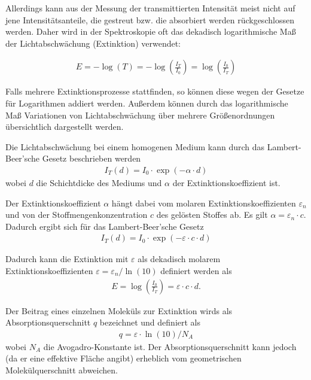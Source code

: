 \documentclass{article}
\begin{document}
Allerdings kann aus der Messung der transmittierten Intensität meist nicht auf jene Intensitätsanteile, die gestreut bzw. die absorbiert werden rückgeschlossen werden. Daher wird in der Spektroskopie oft das dekadisch logarithmische Maß der Lichtabschwächung (Extinktion) verwendet:

\begin{align}
E = -\log(T) = -\log\left(\frac{I_T}{I_0}\right) = \log\left(\frac{I_0}{I_T}\right)
\end{align}

Falls mehrere Extinktionsprozesse stattfinden, so können diese wegen der Gesetze für Logarithmen addiert werden. Außerdem können durch das logarithmische Maß Variationen von Lichtabschwächung über mehrere Größenordnungen übersichtlich dargestellt werden.

Die Lichtabschwächung bei einem homogenen Medium kann durch das Lambert-Beer'sche Gesetz beschrieben werden
\begin{align}
I_T(d) = I_0 \cdot \exp\left(-\alpha\cdot d\right)
\end{align}
wobei $d$ die Schichtdicke des Mediums und $\alpha$ der Extinktionskoeffizient ist.

Der Extinktionskoeffizient $\alpha$ hängt dabei vom molaren Extinktionskoeffizienten $\varepsilon_n$ und von der Stoffmengenkonzentration $c$ des gelösten Stoffes ab. Es gilt $\alpha = \varepsilon_n \cdot c$. Dadurch ergibt sich für das Lambert-Beer'sche Gesetz
\begin{align}
I_T(d) = I_0 \cdot \exp\left(-\varepsilon\cdot c\cdot d\right)
\end{align}

Dadurch kann die Extinktion mit $\varepsilon$ als dekadisch molarem Extinktionskoeffizienten $\varepsilon = \varepsilon_n / \operatorname{ln}(10)$ definiert werden als
\begin{align}
\label{eq:konzentration}
E = \log\left(\frac{I_0}{I_T}\right) = \varepsilon\cdot c\cdot d.
\end{align}

Der Beitrag eines einzelnen Moleküls zur Extinktion wirds als Absorptionsquerschnitt $q$ bezeichnet und definiert als
\begin{align}
q = \varepsilon\cdot \operatorname{ln}(10) / N_A
\end{align}
wobei $N_A$ die Avogadro-Konstante ist. Der Absorptionsquerschnitt kann jedoch (da er eine effektive Fläche angibt) erheblich vom geometrischen Molekülquerschnitt abweichen.
\end{document}
